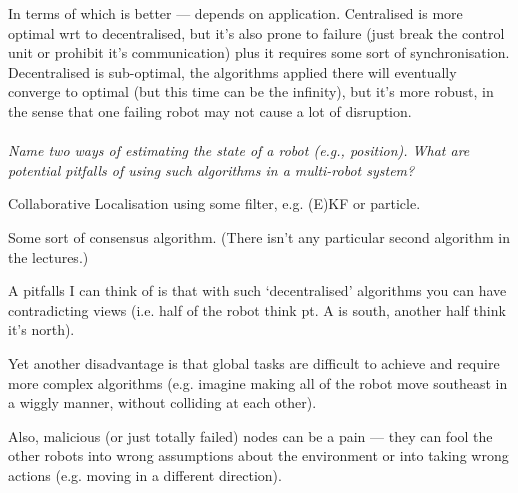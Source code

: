 \documentclass[12pt]{article}
\newcommand*\circled[1]{\tikz[baseline=(char.base)]{
		\node[shape=circle,draw,inner sep=0pt] (char) {#1};}}
\begin{document}
In terms of which is better --- depends on application. Centralised is more
optimal wrt to decentralised, but it's also prone to failure (just break the
control unit or prohibit it's communication) plus it requires some sort of
synchronisation. Decentralised is sub-optimal, the algorithms applied there
will eventually converge to optimal (but this time can be the infinity), but
it's more robust, in the sense that one failing robot may not cause a lot of
disruption.
\\
\\
\textit{\circled{9.} Name two ways of estimating the state of a robot (e.g.,
position). What are potential pitfalls of using such algorithms in
a multi-robot system?}

Collaborative Localisation using some filter, e.g. (E)KF or particle.

Some sort of consensus algorithm. (There isn't any particular second algorithm
in the lectures.)

A pitfalls I can think of is that with such `decentralised' algorithms you can 
have contradicting views (i.e. half of the robot think pt. A is south, another
half think it's north).

Yet another disadvantage is that global tasks are difficult to achieve and
require more complex algorithms (e.g. imagine making all of the robot move
southeast in a wiggly manner, without colliding at each other).

Also, malicious (or just totally failed) nodes can be a pain --- they can
fool the other robots into wrong assumptions about the environment or into
taking wrong actions (e.g. moving in a different direction).
\end{document}
